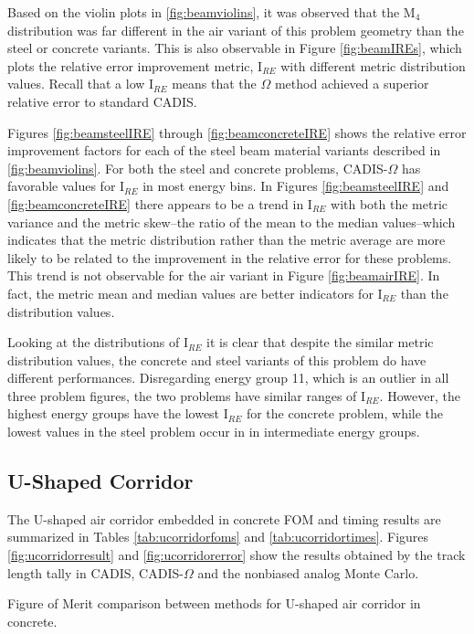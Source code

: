 Based on the violin plots in \ref{fig:beamviolins}, it was observed that
the M$_4$ distribution was far different in the air variant of this problem
geometry than the steel or concrete variants. This is also observable in Figure
\ref{fig:beamIREs}, which plots the relative error improvement metric, I$_{RE}$
with different metric distribution values. Recall that a low I$_{RE}$ means that
the $\Omega$ method achieved a superior relative error to standard CADIS.

Figures \ref{fig:beamsteelIRE} through \ref{fig:beamconcreteIRE} shows the
relative error improvement factors for each of the steel beam material variants
described in \ref{fig:beamviolins}. For both the steel and concrete problems,
CADIS-$\Omega$ has favorable values for I$_{RE}$ in most energy bins. In Figures
\ref{fig:beamsteelIRE} and \ref{fig:beamconcreteIRE} there appears to be a trend
in I$_{RE}$ with both the metric variance and the metric skew--the ratio of the
mean to the median values--which indicates that the metric distribution rather
than the metric average are more likely to be related to the improvement in the
relative error for these problems. This trend is not observable for the air
variant in Figure \ref{fig:beamairIRE}. In fact, the metric mean and median
values are better indicators for I$_{RE}$ than the distribution values.

Looking at the distributions of I$_{RE}$ it is clear that despite the similar
metric distribution values, the concrete and steel variants of this problem do
have different performances. Disregarding energy group 11, which is an outlier
in all three problem figures, the two problems have similar ranges of I$_{RE}$.
However, the highest energy groups have the lowest I$_{RE}$ for the concrete
problem, while the lowest values in the steel problem occur in in intermediate
energy groups.


\subsection{U-Shaped Corridor}
\label{subsec:resultsucorridor}

The U-shaped air corridor embedded in concrete
FOM and timing
results are summarized in Tables
\ref{tab:ucorridorfoms} and \ref{tab:ucorridortimes}. Figures
\ref{fig:ucorridorresult} and \ref{fig:ucorridorerror} show the results obtained
by the track length tally in CADIS, CADIS-$\Omega$ and the nonbiased analog
Monte Carlo.

\begin{table}[h!]
  \centering
  
  \caption[Figure of Merit comparison between methods for U-shaped air corridor in concrete.]
  {Figure of Merit comparison between methods for U-shaped air corridor in
  concrete.}
  \label{tab:ucorridorfoms}
\end{table}

